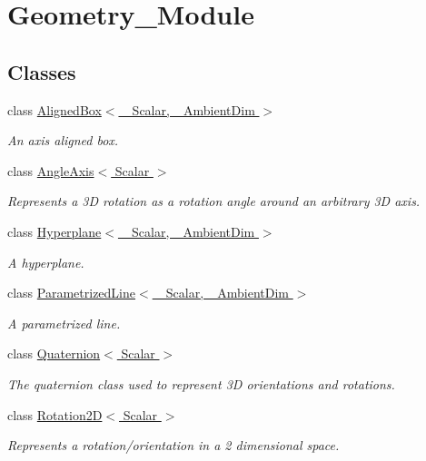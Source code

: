 \hypertarget{group___geometry___module}{\section{Geometry\-\_\-\-Module}
\label{group___geometry___module}
}
\subsection*{Classes}
\begin{DoxyCompactItemize}
\item 
class \hyperlink{class_aligned_box}{Aligned\-Box$<$ \-\_\-\-Scalar, \-\_\-\-Ambient\-Dim $>$}
\begin{DoxyCompactList}\small\item\em An axis aligned box. \end{DoxyCompactList}\item 
class \hyperlink{class_angle_axis}{Angle\-Axis$<$ Scalar $>$}
\begin{DoxyCompactList}\small\item\em Represents a 3\-D rotation as a rotation angle around an arbitrary 3\-D axis. \end{DoxyCompactList}\item 
class \hyperlink{class_hyperplane}{Hyperplane$<$ \-\_\-\-Scalar, \-\_\-\-Ambient\-Dim $>$}
\begin{DoxyCompactList}\small\item\em A hyperplane. \end{DoxyCompactList}\item 
class \hyperlink{class_parametrized_line}{Parametrized\-Line$<$ \-\_\-\-Scalar, \-\_\-\-Ambient\-Dim $>$}
\begin{DoxyCompactList}\small\item\em A parametrized line. \end{DoxyCompactList}\item 
class \hyperlink{class_quaternion}{Quaternion$<$ Scalar $>$}
\begin{DoxyCompactList}\small\item\em The quaternion class used to represent 3\-D orientations and rotations. \end{DoxyCompactList}\item 
class \hyperlink{class_rotation2_d}{Rotation2\-D$<$ Scalar $>$}
\begin{DoxyCompactList}\small\item\em Represents a rotation/orientation in a 2 dimensional space. \end{DoxyCompactList}\item 

\end{DoxyCompactItemize}
